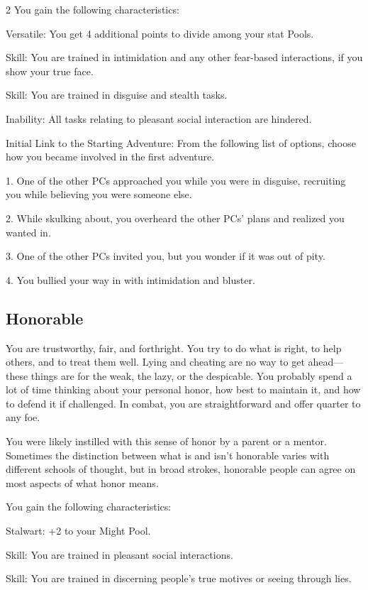 \begin{multicols}{2}
You gain the following characteristics:

Versatile: You get 4 additional points to divide among your stat Pools.

Skill: You are trained in intimidation and any other fear-based interactions, if you show your true face.

Skill: You are trained in disguise and stealth tasks.

Inability: All tasks relating to pleasant social interaction are hindered.

Initial Link to the Starting Adventure: From the following list of options, choose how you became involved in the first adventure.

1. One of the other PCs approached you while you were in disguise, recruiting you while believing you were someone else.

2. While skulking about, you overheard the other PCs’ plans and realized you wanted in.

3. One of the other PCs invited you, but you wonder if it was out of pity.

4. You bullied your way in with intimidation and bluster.

\subsection{Honorable}

You are trustworthy, fair, and forthright. You try to do what is right, to help others, and to treat them well. Lying and cheating are no way to get ahead—these things are for the weak, the lazy, or the despicable. You probably spend a lot of time thinking about your personal honor, how best to maintain it, and how to defend it if challenged. In combat, you are straightforward and offer quarter to any foe.

You were likely instilled with this sense of honor by a parent or a mentor. Sometimes the distinction between what is and isn’t honorable varies with different schools of thought, but in broad strokes, honorable people can agree on most aspects of what honor means. 

You gain the following characteristics:

Stalwart: +2 to your Might Pool.

Skill: You are trained in pleasant social interactions.

Skill: You are trained in discerning people’s true motives or seeing through lies.


\end{multicols}
